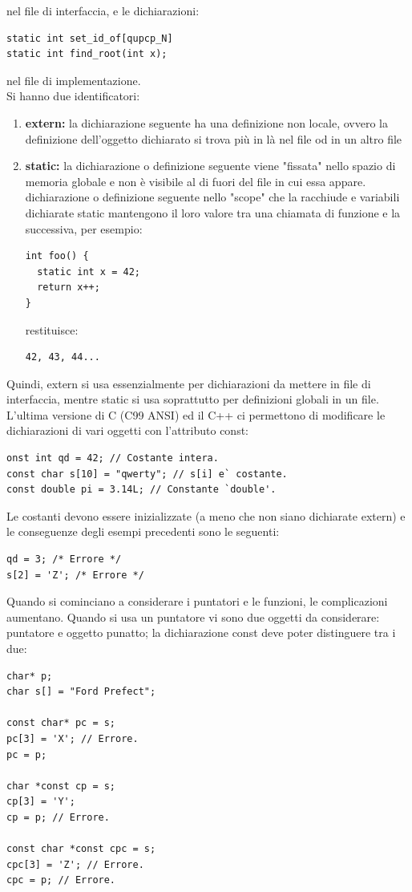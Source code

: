 \documentclass[a4paper,12pt, oneside]{book}
\begin{document}
	nel file di interfaccia, e le dichiarazioni:
	\begin{verbatim}
static int set_id_of[qupcp_N]
static int find_root(int x);
\end{verbatim}
	nel file di implementazione.\\
	Si hanno due identificatori:
	\begin{enumerate}
		\item \textbf{extern:} la dichiarazione seguente ha una definizione non locale, ovvero la
		      definizione dell'oggetto dichiarato si trova più in là nel file od in un
		      altro file
		\item \textbf{static:} la dichiarazione o definizione seguente viene "fissata" nello spazio
		      di memoria globale e non è visibile al di fuori del file in cui essa appare. dichiarazione o
		      definizione seguente nello "scope" che la racchiude e variabili dichiarate static mantengono il loro valore tra una
		      chiamata di funzione e la successiva, per esempio:
		      \begin{verbatim}
int foo() {
  static int x = 42;
  return x++;
}
\end{verbatim}
		      restituisce:
		      \begin{verbatim}
42, 43, 44...
\end{verbatim}
	\end{enumerate}
	Quindi, extern si usa essenzialmente per dichiarazioni da
	mettere in file di interfaccia, mentre static si usa soprattutto per definizioni globali in un file.\\
	L'ultima versione di C (C99 ANSI) ed il C++ ci permettono di modificare le dichiarazioni di vari oggetti con l'attributo const:
	\begin{verbatim}
onst int qd = 42; // Costante intera.
const char s[10] = "qwerty"; // s[i] e` costante.
const double pi = 3.14L; // Constante `double'.
\end{verbatim}
	Le costanti devono essere inizializzate (a meno che non siano
	dichiarate extern) e le conseguenze degli esempi precedenti sono le seguenti:
	\begin{verbatim}
qd = 3; /* Errore */
s[2] = 'Z'; /* Errore */
\end{verbatim}
	Quando si cominciano a considerare i puntatori e le funzioni, le complicazioni aumentano. Quando si usa un puntatore vi sono due oggetti da considerare: puntatore e oggetto punatto; la dichiarazione const deve poter distinguere tra i due:
	\begin{verbatim}
char* p;
char s[] = "Ford Prefect";

const char* pc = s;
pc[3] = 'X'; // Errore.
pc = p;

char *const cp = s;
cp[3] = 'Y';
cp = p; // Errore.

const char *const cpc = s;
cpc[3] = 'Z'; // Errore.
cpc = p; // Errore.
\end{verbatim}
\end{document}
